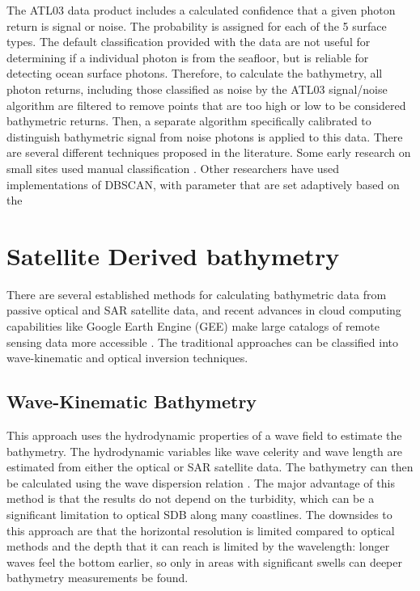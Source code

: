 The ATL03 data product includes a calculated confidence that a given photon return is signal or noise. The probability is assigned for each of the 5 surface types. The default classification provided with the data are not useful for determining if a individual photon is from the seafloor, but is reliable for detecting ocean surface photons. Therefore, to calculate the bathymetry, all photon returns, including those classified as noise by the ATL03 signal/noise algorithm are filtered to remove points that are too high or low to be considered bathymetric returns. Then, a separate algorithm specifically calibrated to distinguish bathymetric signal from noise photons is applied to this data. There are several different techniques proposed in the literature. Some early research on small sites used manual classification \parencite{Forfinski-Sarkozi2016}. Other researchers have used implementations of DBSCAN, with parameter that are set adaptively based on the 


\section{Satellite Derived bathymetry}
There are several established methods for calculating bathymetric data from passive optical and SAR satellite data, and recent advances in cloud computing capabilities like Google Earth Engine (GEE) \parencite{Gorelick2017a} make large catalogs of remote sensing data more accessible \parencite{Pike2019,Turner2021}. The traditional approaches can be classified into wave-kinematic and optical inversion techniques.

\subsection{Wave-Kinematic Bathymetry}
This approach uses the hydrodynamic properties of a wave field to estimate the bathymetry. The hydrodynamic variables like wave celerity and wave length are estimated from either the optical or SAR satellite data. The bathymetry can then be calculated using the wave dispersion relation \cite{Almar2021e}. The major advantage of this method is that the results do not depend on the turbidity, which can be a significant limitation to optical SDB along many coastlines. The downsides to this approach are that the horizontal resolution is limited compared to optical methods and the depth that it can reach is limited by the wavelength: longer waves feel the bottom earlier, so only in areas with significant swells can deeper bathymetry measurements be found.\parencite{Almar2021e}

